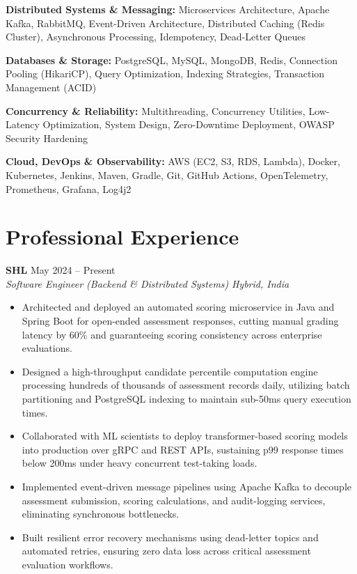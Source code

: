 \documentclass[10pt,a4paper]{article}
\newcommand{\jobheading}[4]{
  \textbf{#1} \hfill #2\\
  \textit{#3} \hfill \textit{#4}\\[-2pt]
}
\begin{document}
\textbf{Distributed Systems \& Messaging:}
Microservices Architecture, Apache Kafka, RabbitMQ, Event-Driven Architecture, Distributed Caching (Redis Cluster), Asynchronous Processing, Idempotency, Dead-Letter Queues

\textbf{Databases \& Storage:}
PostgreSQL, MySQL, MongoDB, Redis, Connection Pooling (HikariCP), Query Optimization, Indexing Strategies, Transaction Management (ACID)

\textbf{Concurrency \& Reliability:}
Multithreading, Concurrency Utilities, Low-Latency Optimization, System Design, Zero-Downtime Deployment, OWASP Security Hardening

\textbf{Cloud, DevOps \& Observability:}
AWS (EC2, S3, RDS, Lambda), Docker, Kubernetes, Jenkins, Maven, Gradle, Git, GitHub Actions, OpenTelemetry, Prometheus, Grafana, Log4j2


\section{Professional Experience}

\jobheading
  {SHL}
  {May 2024 -- Present}
  {Software Engineer (Backend \& Distributed Systems)}
  {Hybrid, India}

\begin{itemize}
  \item Architected and deployed an automated scoring microservice in Java and Spring Boot for open-ended assessment responses, cutting manual grading latency by 60\% and guaranteeing scoring consistency across enterprise evaluations.
  \item Designed a high-throughput candidate percentile computation engine processing hundreds of thousands of assessment records daily, utilizing batch partitioning and PostgreSQL indexing to maintain sub-50ms query execution times.
  \item Collaborated with ML scientists to deploy transformer-based scoring models into production over gRPC and REST APIs, sustaining p99 response times below 200ms under heavy concurrent test-taking loads.
  \item Implemented event-driven message pipelines using Apache Kafka to decouple assessment submission, scoring calculations, and audit-logging services, eliminating synchronous bottlenecks.
  \item Built resilient error recovery mechanisms using dead-letter topics and automated retries, ensuring zero data loss across critical assessment evaluation workflows.
\end{itemize}
\end{document}
